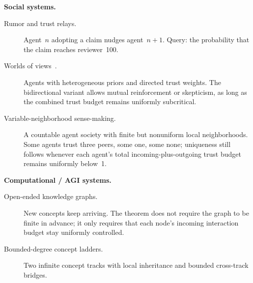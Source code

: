 \documentclass[11pt,openany]{report}
\begin{document}
\smallskip\noindent\textbf{Social systems.}
\begin{description}
\item[Rumor and trust relays.]  Agent~$n$ adopting a claim nudges
  agent~$n{+}1$.  Query: the probability that the claim reaches reviewer~100.
\item[Worlds of views~\cite{VeitasWeinbaum2015}.]  Agents with heterogeneous
  priors and directed trust weights.  The bidirectional variant allows mutual
  reinforcement or skepticism, as long as the combined trust budget remains
  uniformly subcritical.
\item[Variable-neighborhood sense-making.]  A countable agent society with
  finite but nonuniform local neighborhoods.  Some agents trust three peers,
  some one, some none; uniqueness still follows whenever each agent's total
  incoming-plus-outgoing trust budget remains uniformly below~1.
\end{description}

\smallskip\noindent\textbf{Computational / AGI systems.}
\begin{description}
\item[Open-ended knowledge graphs.]  New concepts keep arriving.  The theorem
  does not require the graph to be finite in advance; it only requires that
  each node's incoming interaction budget stay uniformly controlled.
\item[Bounded-degree concept ladders.]  Two infinite concept tracks with local
  inheritance and bounded cross-track bridges.
\end{description}
\end{document}
